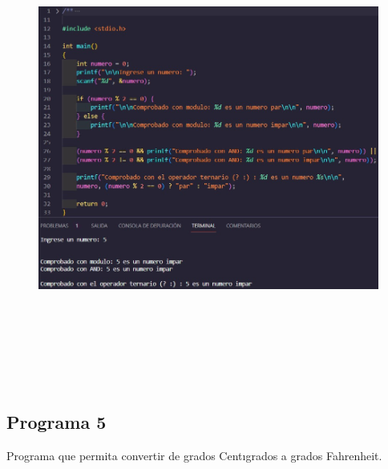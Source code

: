 \documentclass{article}
\begin{document}
\begin{figure}[H]
    \centering
    \includegraphics[height = 15.5cm]{img4.jpg}
\end{figure}

\newpage

\subsection{Programa 5}

Programa que permita convertir de grados Centıgrados a grados Fahrenheit.
\end{document}
